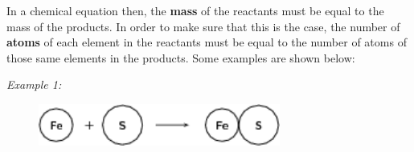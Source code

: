         \label{m38726*id63221}In a chemical equation then, the \textbf{mass} of the reactants must be equal to the mass of the products. In order to make sure that this is the case, the number of \textbf{atoms} of each element in the reactants must be equal to the number of atoms of those same elements in the products. Some examples are shown below:\par 
        \label{m38726*id63238}
          \textsl{Example 1:}
        \label{m38726*id63246}\nopagebreak\noindent{}
    
        \par 
        \label{m38726*id63273}
          
    \setcounter{subfigure}{0}


	\begin{figure}[H] %
    \begin{center}
    \label{m38726*id63276!!!underscore!!!media}\label{m38726*id63276!!!underscore!!!printimage}\includegraphics[width=300px]{col11305.imgs/m38726_CG10C5_001.png} %
        
      \vspace{2pt}
    \vspace{.1in}
    
    \end{center}

 \end{figure}   

